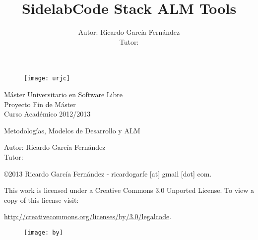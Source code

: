 \documentclass[a4paper, 12pt]{book}
\title{\textbf{SidelabCode Stack ALM Tools}}
\author{Autor: Ricardo Garc\'ia Fern\'andez
\\Tutor: }
\begin{document}
\renewcommand{\refname}{Bibliograf\'ia}  %
\renewcommand{\appendixname}{Ap\'endice}

\begin{titlepage}
\begin{center}

\begin{figure}[h]
    \begin{center}
        \texttt{[image: urjc]}
        \label{fig:urjc}
    \end{center}
\end{figure}

\begin{center}
\large
M\'aster Universitario en Software Libre
\\ Proyecto Fin de M\'aster
\\Curso Acad\'emico 2012/2013
\end{center}

\vspace{2cm}

\begin{center}

\LARGE
Metodolog\'ias, Modelos de Desarrollo y ALM

\large
Autor: Ricardo Garc\'ia Fern\'andez
\\Tutor:
\end{center}

\vfill

\begin{flushright}
\small
    \copyright 2013 Ricardo Garc\'ia Fern\'andez - ricardogarfe [at] gmail [dot] com.

    This work is licensed under a Creative Commons 3.0 Unported License.
    To view a copy of this license visit:
 
    \url{http://creativecommons.org/licenses/by/3.0/legalcode}.
\end{flushright}

\begin{figure}[h]
    \begin{flushright}	
        \texttt{[image: by]}
        \label{fig:by}
    \end{flushright}
\end{figure}

\end{center}
\end{titlepage}

\newpage

\end{document}
